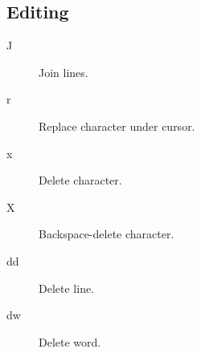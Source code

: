 \subsection{Editing}
\begin{description}
\item[J] Join lines.
\item[r] Replace character under cursor.
\item[x] Delete character.
\item[X] Backspace-delete character.
\item[dd] Delete line.
\item[dw] Delete word.
\end{description}
